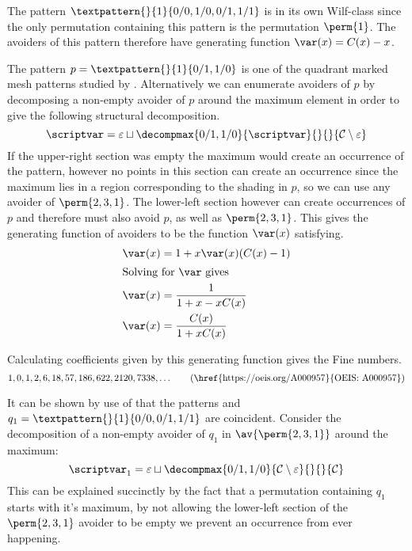 The pattern \(\textpattern{}{1}{0/0,1/0,0/1,1/1}\) is in its own
Wilf-class since the only permutation containing this pattern is
the permutation \(\perm{1}\). The avoiders of this pattern therefore
have generating function \(\var(x) = C(x)-x\).

\nextvar
The pattern \(p = \textpattern{}{1}{0/1,1/0}\) is one of the
quadrant marked mesh patterns studied by \textcite{2012arXiv1201.6243K}.
Alternatively we can enumerate
avoiders of \(p\) by decomposing a non-empty avoider of \(p\) around the maximum element
in order to give the following structural decomposition.
\begin{equation*}
    \scriptvar = \varepsilon \sqcup \decompmax{0/1,1/0}{\scriptvar}{}{}{\mathcal{C}\setminus\varepsilon}
\end{equation*}
If the upper-right section was empty the maximum would create an
occurrence of the pattern, however no points in this section can create
an occurrence since the maximum lies in a region corresponding to the
shading in \(p\), so we can use any avoider of \(\perm{2,3,1}\). The lower-left section however can create occurrences
of \(p\) and therefore must also avoid \(p\), as well as \(\perm{2,3,1}\).
This gives the generating function of avoiders to be the function \(\var(x)\)
satisfying.
\begin{align*}
    \var(x) &= 1 + x\var(x)(C(x)-1) \\
    \shortintertext{Solving for \(\var\) gives}
    \var(x) &= \frac{1}{1+x-xC(x)}\\
    \var(x) &= \frac{C(x)}{1+xC(x)}
\end{align*}

Calculating coefficients given by this generating function gives the Fine numbers.
\begin{equation*}
    1, 0, 1, 2, 6, 18, 57, 186, 622, 2120, 7338,\dotsc \tag{\href{https://oeis.org/A000957}{OEIS: A000957}}
\end{equation*}


\nextvar[\varfine]
It can be shown by use of  that the patterns
 and \(q_1 = \textpattern{}{1}{0/0,0/1,1/1}\) are
coincident. Consider the decomposition of a non-empty avoider of \(q_1\) in
\(\av{\perm{2,3,1}}\) around the maximum:
\begin{equation*}
    \scriptvar_1 =\varepsilon \sqcup \decompmax{0/1,1/0}{\mathcal{C}\setminus\varepsilon}{}{}{\mathcal{C}}
\end{equation*}
This can be explained succinctly by the fact that a permutation containing
\(q_1\) starts with it's maximum, by not allowing the lower-left section of the
\(\perm{2,3,1}\) avoider to be empty we prevent an occurrence from ever happening.

